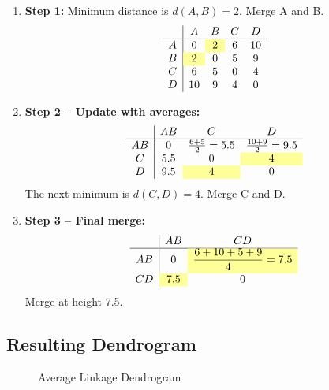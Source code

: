 \documentclass{article}
\begin{document}
\begin{enumerate}
    \item \textbf{Step 1:} Minimum distance is $d(A,B) = 2$. Merge A and B.
    \[
    \begin{array}{c|cccc}
        & A & B & C & D \\
    \hline
    A & 0 & \cellcolor{highlight}2 & 6 & 10 \\
    B & \cellcolor{highlight}2 & 0 & 5 & 9  \\
    C & 6 & 5 & 0 & 4  \\
    D & 10 & 9 & 4 & 0  \\
    \end{array}
    \]

    \item \textbf{Step 2 -- Update with averages:}
    \[
    \begin{array}{c|ccc}
        & AB & C & D \\
    \hline
    AB & 0 & \frac{6+5}{2} = 5.5 & \frac{10+9}{2} = 9.5 \\
    C  & 5.5 & 0 & \cellcolor{highlight}4 \\
    D  & 9.5 & \cellcolor{highlight}4 & 0 \\
    \end{array}
    \]
    The next minimum is $d(C,D) = 4$. Merge C and D.

    \item \textbf{Step 3 -- Final merge:}
    \[
    \begin{array}{c|cc}
        & AB & CD \\
    \hline
    AB & 0 & \cellcolor{highlight}{\dfrac{6+10+5+9}{4} = 7.5} \\[6pt]
    CD & \cellcolor{highlight}{7.5} & 0 \\
    \end{array}
    \]
    Merge at height 7.5.
\end{enumerate}

\subsection{Resulting Dendrogram}

\begin{figure}[h]
    \centering
    \caption{Average Linkage Dendrogram}
    \label{fig:average_linkage_dendrogram}
\end{figure}
\end{document}
